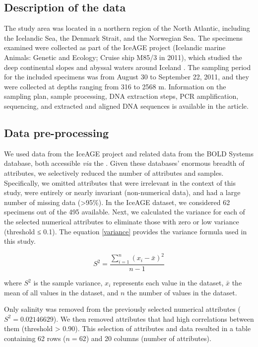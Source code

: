 \subsection{Description of the data}
The study area was located in a northern region of the North Atlantic, including the Icelandic Sea, the Denmark Strait, and the Norwegian Sea. The specimens examined were collected as part of the IceAGE project (Icelandic marine Animals: Genetic and Ecology; Cruise ship M85/3 in 2011), which studied the deep continental slopes and abyssal waters around Iceland \citep{meisner_prefacebiodiversity_2018}. The sampling period for the included specimens was from August 30 to September 22, 2011, and they were collected at depths ranging from 316 to 2568 m. Information on the sampling plan, sample processing, DNA extraction steps, PCR amplification, sequencing, and extracted and aligned DNA sequences is available in the \citep{uhlir_adding_2021} article.

\subsection{Data pre-processing}
We used data from the IceAGE project and related data from the BOLD Systems database, both accessible \emph{via} the \citep{uhlir_adding_2021}. Given these databases' enormous breadth of attributes, we selectively reduced the number of attributes and samples. Specifically, we omitted attributes that were irrelevant in the context of this study, were entirely or nearly invariant (non-numerical data), and had a large number of missing data (>95\%). In the IceAGE dataset, we considered 62 specimens out of the 495 available. Next, we calculated the variance for each of the selected numerical attributes to eliminate those with zero or low variance (threshold ≤ 0.1). The equation \ref{variance} provides the variance formula used in this study.

\begin{equation}\label{variance}
    S^2 = \frac{\sum_{i=1}^{n} (x_i - \bar{x})^2}{n-1}
\end{equation}

where $S^2$ is the sample variance, $x_i$ represents each value in the dataset, $\bar{x}$ the mean of all values in the dataset, and $n$ the number of values in the dataset.

Only salinity was removed from the previously selected numerical attributes ($S^2 = 0.02146629$). We then removed attributes that had high correlations between them (threshold > 0.90). This selection of attributes and data resulted in a table containing 62 rows ($n=62$) and 20 columns (number of attributes). 

